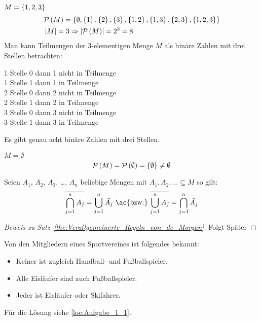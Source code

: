 \begin{example}
$M = \left\{1, 2, 3\right\}$
\begin{align*}
&\mathcal{P}\left(M\right) = \left\{\emptyset, \left\{1\right\}, \left\{2\right\}, \left\{3\right\}, \left\{1,2\right\}, \left\{1,3\right\}, \left\{2,3\right\}, \left\{1,2,3\right\}\right\}\\
&\left|M\right| = 3 \Rightarrow \left|\mathcal{P}\left(M\right)\right| = 2^3 = 8
\end{align*}
Man kann Teilmengen der 3-elementigen Menge $M$ als binäre Zahlen mit drei Stellen betrachten:

1 Stelle 0 dann 1 nicht in Teilmenge\\
1 Stelle 1 dann 1 in Teilmenge\\
2 Stelle 0 dann 2 nicht in Teilmenge\\
2 Stelle 1 dann 2 in Teilmenge\\
3 Stelle 0 dann 3 nicht in Teilmenge\\
3 Stelle 1 dann 3 in Teilmenge

Es gibt genau acht binäre Zahlen mit drei Stellen.
\end{example}

\begin{note}
$M = \emptyset$ \[\mathcal{P}\left(M\right) = \mathcal{P}\left(\emptyset\right) = \left\{\emptyset\right\} \neq \emptyset\]
\end{note}

\begin{theorem}
Seien $A_1$, $A_2$, $A_3$, \dots, $A_n$ beliebige Mengen mit $A_1, A_2, \dots \subseteq M$ so gilt:
\[\ol{\bigcap_{j = 1}^{n} A_j} = \bigcup_{j = 1}^{n} \bar{A_j} \tx{ \ac{bzw.} } \ol{\bigcup_{j = 1}^{n} A_j} = \bigcap_{j = 1}^{n} \bar{A_j}\]
\label{the:Verallgemeinerte_Regeln_von_de_Morgan}
\end{theorem}

\begin{proof}[Beweis zu Satz~\vref{the:Verallgemeinerte_Regeln_von_de_Morgan}]
Folgt Später
\end{proof}

\begin{exercise}
Von den Mitgliedern eines Sportvereines ist folgendes bekannt:
\begin{itemize}
\item Keiner ist zugleich Handball- und Fußballspieler.
\item Alle Eisläufer sind auch Fußballspieler.
\item Jeder ist Eisläufer oder Skifahrer.
\end{itemize}
Für die Lösung siehe \vref{loe:Aufgabe_1_1}.
\label{exc:Aufgabe_1_1}
\end{exercise}
